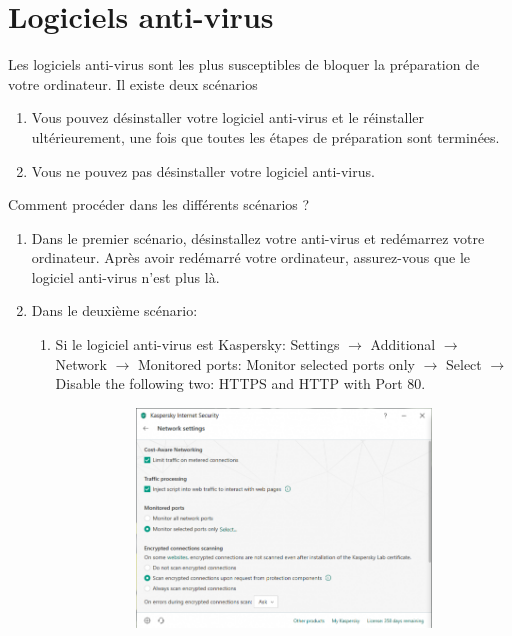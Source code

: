 \documentclass{article}
\begin{document}
\section{Logiciels anti-virus}
Les logiciels anti-virus sont les plus susceptibles de bloquer la préparation de votre ordinateur. Il existe deux scénarios
\begin{enumerate}
\item Vous pouvez désinstaller votre logiciel anti-virus et le réinstaller ultérieurement, une fois que toutes les étapes de préparation sont terminées.
\item Vous ne pouvez pas désinstaller votre logiciel anti-virus.
\end{enumerate}

Comment procéder dans les différents scénarios ?
\begin{enumerate}
\item Dans le premier scénario, désinstallez votre anti-virus et redémarrez votre ordinateur. Après avoir redémarré votre ordinateur, assurez-vous que le logiciel anti-virus n'est plus là.
\item Dans le deuxième scénario:
\begin{enumerate}
\item Si le logiciel anti-virus est Kaspersky: Settings $\rightarrow$ Additional $\rightarrow$ Network $\rightarrow$ Monitored ports: Monitor selected ports only $\rightarrow$ Select $\rightarrow$ Disable the following two: HTTPS  and HTTP with Port 80. 
\begin{figure}[H]
\begin{subfigure}[c]{0.7\textwidth}
\includegraphics[width=1\textwidth]{Plots/Kasp1.png}

\end{subfigure}
\end{figure}
\end{enumerate}
\end{enumerate}
\end{document}
